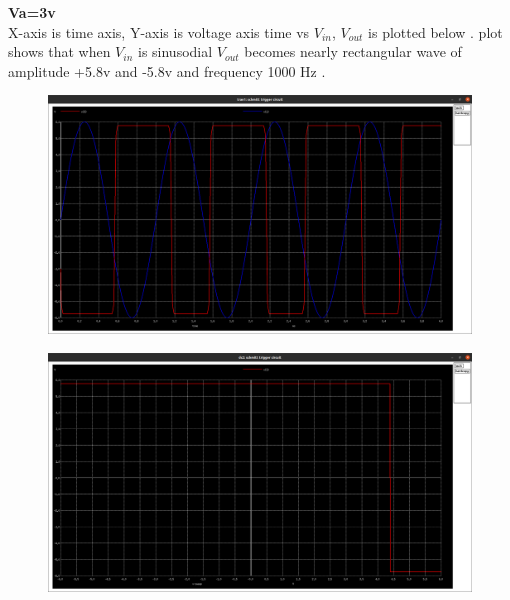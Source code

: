 \documentclass[12pt]{article}
\begin{document}
\textbf{Va=3v\\}
X-axis is time axis, Y-axis is voltage axis time vs \(V_{in}\), \(V_{out}\) is plotted below . plot shows that when \(V_{in}\) is sinusodial \(V_{out}\) becomes nearly rectangular wave of amplitude +5.8v and -5.8v and frequency 1000 Hz .\\
\begin{figure}[h!]
\centering
\includegraphics[scale = 0.2]{q1_3_sin.png}
\end{figure}
\newpage
\begin{figure}[h!]
\centering
\includegraphics[scale = 0.2]{q1_3_dc.png}
\end{figure}
\newpage
\end{document}
